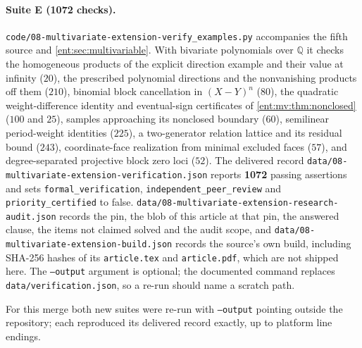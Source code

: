 \documentclass[11pt]{article}
\theoremstyle{plain}
\theoremstyle{plain}
\theoremstyle{plain}
\theoremstyle{definition}
\theoremstyle{definition}
\theoremstyle{definition}
\theoremstyle{definition}
\theoremstyle{remark}
\newcommand{\Q}{\mathbb Q}\newcommand{\Z}{\mathbb Z}\newcommand{\N}{\mathbb N}
\begin{document}
\paragraph{Suite E (1072 checks).}
\texttt{code/08-multivariate-extension-verify\_examples.py} accompanies the
fifth source and \cref{ent:sec:multivariable}. With bivariate polynomials over
$\Q$ it checks the homogeneous products of the explicit direction example and
their value at infinity ($20$), the prescribed polynomial directions and the
nonvanishing products off them ($210$), binomial block cancellation in
$(X-Y)^n$ ($80$), the quadratic weight-difference identity and eventual-sign
certificates of \cref{ent:mv:thm:nonclosed} ($100$ and $25$), samples
approaching its nonclosed boundary ($60$), semilinear period-weight identities
($225$), a two-generator relation lattice and its residual bound ($243$),
coordinate-face realization from minimal excluded faces ($57$), and
degree-separated projective block zero loci ($52$). The delivered record
\texttt{data/08-multivariate-extension-verification.json} reports
\textbf{1072} passing assertions and sets \texttt{formal\_verification},
\texttt{independent\_peer\_review} and \texttt{priority\_certified} to false.
\texttt{data/08-multivariate-extension-research-audit.json} records the pin,
the blob of this article at that pin, the answered clause, the items not
claimed solved and the audit scope, and
\texttt{data/08-multivariate-extension-build.json} records the source's own
build, including SHA-256 hashes of its \texttt{article.tex} and
\texttt{article.pdf}, which are not shipped here. The \texttt{--output}
argument is optional; the documented command replaces
\texttt{data/verification.json}, so a re-run should name a scratch path.

For this merge both new suites were re-run with \texttt{--output} pointing
outside the repository; each reproduced its delivered record exactly, up to
platform line endings.
\end{document}
